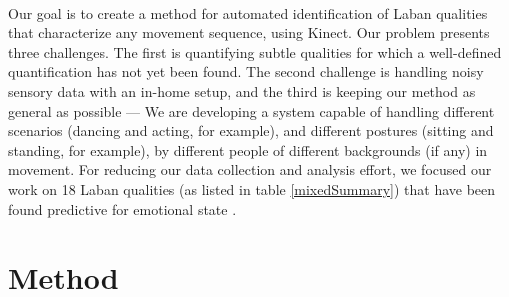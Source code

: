 \documentclass[11pt,twocolumn,varwidth=true,a4paper,fleqn]{article}
\begin{document}
\mbox{}\\
\par
Our goal is to create a method for automated identification of Laban qualities that
characterize any movement sequence, using Kinect.
Our problem presents three challenges. The first is
quantifying subtle qualities for which a well-defined quantification has not yet been found.
The second challenge is handling noisy sensory data with an in-home setup, and the
third is keeping our method as general as possible --- We are developing a system capable of
handling different scenarios (dancing and acting, for example), and different postures
(sitting and standing, for example), by different people of different backgrounds (if any)
in movement. For reducing our data collection and analysis effort, we focused our work on 18 Laban qualities
(as listed in table \ref{mixedSummary}) that have been found predictive for emotional state
\cite{ShafirPrivate}.

\section{Method}
\end{document}
